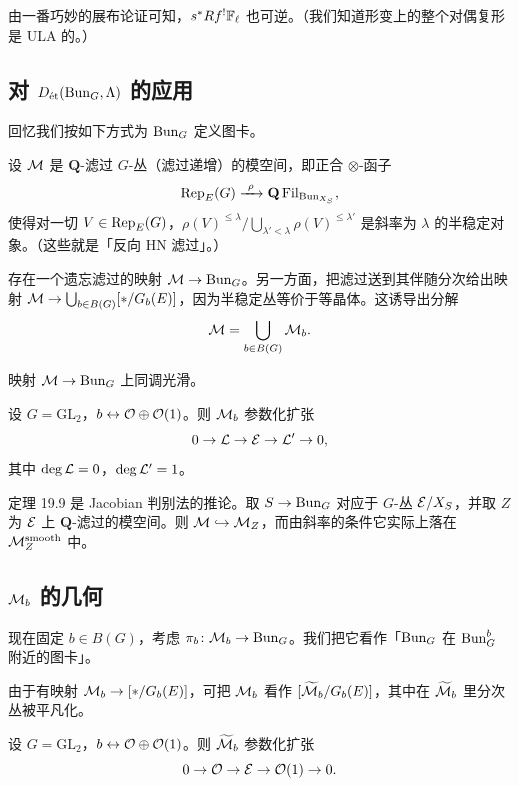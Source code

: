 
由一番巧妙的展布论证可知，$s^*Rf^!\Fl$ 也可逆。（我们知道形变上的整个对偶复形是 ULA 的。）

\subsection{对 $D_{\et}(\Bun_G,\Lambda)$ 的应用}

回忆我们按如下方式为 $\Bun_G$ 定义图卡。

\begin{definition}
设 $\cM$ 是 $\mathbf{Q}$-滤过 $G$-丛（滤过递增）的模空间，即正合 $\otimes$-函子
\[
\Rep_E(G)\xrightarrow{\ \rho\ }\mathbf{Q}\,\mathrm{Fil}_{\Bun_{X_S}},
\]
使得对一切 $V\in\Rep_E(G)$，$\rho(V)^{\le\lambda}\big/\bigcup_{\lambda'<\lambda}\rho(V)^{\le\lambda'}$ 是斜率为 $\lambda$ 的半稳定对象。（这些就是「反向 HN 滤过」。）
\end{definition}

存在一个遗忘滤过的映射 $\cM\to\Bun_G$。另一方面，把滤过送到其伴随分次给出映射 $\cM\to\bigcup_{b\in B(G)}[\ast/G_b(E)]$，因为半稳定丛等价于等晶体。这诱导出分解
\[
\cM=\bigcup_{b\in B(G)}\cM_b.
\]

\begin{theorem}
映射 $\cM\to\Bun_G$ 上同调光滑。
\end{theorem}

\begin{example}
设 $G=\mathrm{GL}_2$，$b\leftrightarrow\cO\oplus\cO(1)$。则 $\cM_b$ 参数化扩张
\[
0\to\cL\to\cE\to\cL'\to0,
\]
其中 $\deg\cL=0$，$\deg\cL'=1$。
\end{example}

定理 19.9 是 Jacobian 判别法的推论。取 $S\to\Bun_G$ 对应于 $G$-丛 $\cE/X_S$，并取 $Z$ 为 $\cE$ 上 $\mathbf{Q}$-滤过的模空间。则 $\cM\hookrightarrow\cM_Z$，而由斜率的条件它实际上落在 $\cM_Z^{\mathrm{smooth}}$ 中。

\subsection{$\cM_b$ 的几何}

现在固定 $b\in B(G)$，考虑 $\pi_b\colon\cM_b\to\Bun_G$。我们把它看作「$\Bun_G$ 在 $\Bun^b_G$ 附近的图卡」。

由于有映射 $\cM_b\to[\ast/G_b(E)]$，可把 $\cM_b$ 看作 $[\wt\cM_b/G_b(E)]$，其中在 $\wt\cM_b$ 里分次丛被平凡化。

\begin{example}
设 $G=\mathrm{GL}_2$，$b\leftrightarrow\cO\oplus\cO(1)$。则 $\wt\cM_b$ 参数化扩张
\[
0\to\cO\to\cE\to\cO(1)\to0.
\]
\end{example}

